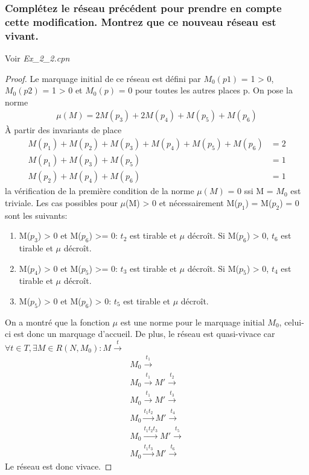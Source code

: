 \documentclass[french]{article}
\begin{document}
\subsubsection{Complétez le réseau précédent pour prendre en compte cette modification. Montrez que ce nouveau réseau est 
vivant.}
Voir \textit{Ex\_2\_2.cpn}
\begin{proof}
Le marquage initial de ce réseau est défini par $M_0(p1)$ = 1 > 0, $M_0(p2)$ = 1 > 0 et $M_0(p)$ = 0 pour toutes les autres 
places p. On pose la norme
\begin{align*}
\mu(M) = 2M(p_3) + 2M(p_4) + M(p_5) + M(p_6)
\end{align*}
À partir des invariants de place
\begin{align*}
M(p_1) + M(p_2) + M(p_3) + M(p_4) + M(p_5) + M(p_6) &= 2 \\
M(p_1) + M(p_3) + M(p_5) &= 1 \\
M(p_2) + M(p_4) + M(p_6) &= 1
\end{align*}
la vérification de la première condition de la norme $\mu(M)$ = 0 ssi M = $M_0$ est triviale. Les cas possibles pour 
$\mu$(M) > 0 et nécessairement M($p_1$) = M($p_2$) = 0 sont les 
suivants:
\begin{enumerate}
\item M($p_3$) > 0 et M($p_6$) >= 0: $t_2$ est tirable et $\mu$ décroît. Si M($p_6$) > 0, $t_6$ est tirable et $\mu$ décroît.
\item M($p_4$) > 0 et M($p_5$) >= 0: $t_3$ est tirable et $\mu$ décroît. Si M($p_5$) > 0, $t_4$ est tirable et $\mu$ décroît.
\item M($p_5$) > 0 et M($p_6$) > 0: $t_5$ est tirable et $\mu$ décroît. 	
\end{enumerate}
On a montré que la fonction $\mu$ est une norme pour le marquage initial $M_0$, celui-ci est donc un marquage d'accueil. De 
plus, le réseau est quasi-vivace car $\forall t \in T, \exists M \in R(N, M_0): M \xrightarrow{t}$
\begin{align*}
M_0 \xrightarrow{t_1} \\
M_0 \xrightarrow{t_1} M' \xrightarrow{t_2} \\
M_0 \xrightarrow{t_1} M' \xrightarrow{t_3} \\ 
M_0 \xrightarrow{t_1 t_2} M' \xrightarrow{t_4} \\ 
M_0 \xrightarrow{t_1 t_2 t_3} M' \xrightarrow{t_5} \\ 
M_0 \xrightarrow{t_1 t_3} M' \xrightarrow{t_6} 
\end{align*}
Le réseau est donc vivace.
\end{proof}
\end{document}
